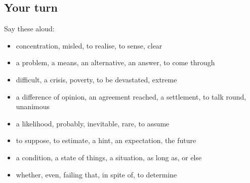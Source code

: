 \subsection*{Your turn}
Say these aloud:

\begin{itemize}
\raggedright
  \item concentration, misled, to realise, to sense, clear
  \item a problem, a means, an alternative, an answer, to come through
  \item difficult, a crisis, poverty, to be devastated, extreme
  \item a difference of opinion, an agreement reached, a settlement, to talk round, unanimous
  \item a likelihood, probably, inevitable, rare, to assume
  \item to suppose, to estimate, a hint, an expectation, the future
  \item a condition, a state of things, a situation, as long as, or else
  \item whether, even, failing that, in spite of, to determine
\end{itemize}

